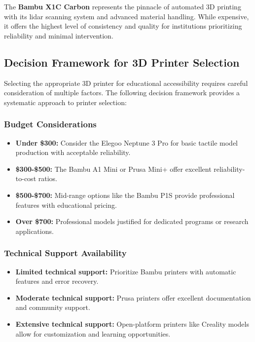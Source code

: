 The \textbf{Bambu X1C Carbon} represents the pinnacle of automated 3D printing with its lidar scanning system and advanced material handling. While expensive, it offers the highest level of consistency and quality for institutions prioritizing reliability and minimal intervention.

\subsection{Decision Framework for 3D Printer Selection}\label{ch5:subsec:decision-framework}

Selecting the appropriate 3D printer for educational accessibility requires careful consideration of multiple factors. The following decision framework provides a systematic approach to printer selection:

\subsubsection{Budget Considerations}
\begin{itemize}
	\item \textbf{Under \$300:} Consider the Elegoo Neptune 3 Pro for basic tactile model production with acceptable reliability.
	\item \textbf{\$300-\$500:} The Bambu A1 Mini or Prusa Mini+ offer excellent reliability-to-cost ratios.
	\item \textbf{\$500-\$700:} Mid-range options like the Bambu P1S provide professional features with educational pricing.
	\item \textbf{Over \$700:} Professional models justified for dedicated programs or research applications.
\end{itemize}

\subsubsection{Technical Support Availability}
\begin{itemize}
	\item \textbf{Limited technical support:} Prioritize Bambu printers with automatic features and error recovery.
	\item \textbf{Moderate technical support:} Prusa printers offer excellent documentation and community support.
	\item \textbf{Extensive technical support:} Open-platform printers like Creality models allow for customization and learning opportunities.
\end{itemize}

